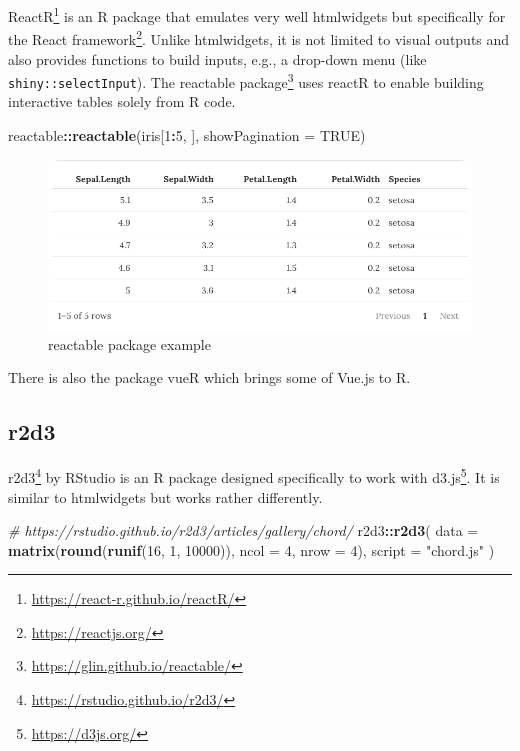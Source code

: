 \documentclass[
  10pt,
]{krantz}
\makeatletter
\newenvironment{Shaded}{\begin{snugshade}}{\end{snugshade}}
\newcommand{\CommentTok}[1]{\textcolor[rgb]{0.37,0.37,0.37}{\textit{#1}}}
\newcommand{\DataTypeTok}[1]{\textcolor[rgb]{0.27,0.27,0.27}{#1}}
\newcommand{\DecValTok}[1]{\textcolor[rgb]{0.06,0.06,0.06}{#1}}
\newcommand{\KeywordTok}[1]{\textcolor[rgb]{0.27,0.27,0.27}{\textbf{#1}}}
\newcommand{\NormalTok}[1]{#1}
\newcommand{\OperatorTok}[1]{\textcolor[rgb]{0.43,0.43,0.43}{\textbf{#1}}}
\newcommand{\OtherTok}[1]{\textcolor[rgb]{0.37,0.37,0.37}{#1}}
\newcommand{\StringTok}[1]{\textcolor[rgb]{0.5,0.5,0.5}{#1}}
\renewcommand{\href}[2]{#2\footnote{\url{#1}}}
\newenvironment{kframe}{%
\medskip{}
\setlength{\fboxsep}{.8em}
 \def\at@end@of@kframe{}%
 \ifinner\ifhmode%
  \def\at@end@of@kframe{\end{minipage}}%
  \begin{minipage}{\columnwidth}%
 \fi\fi%
 \def\FrameCommand##1{\hskip\@totalleftmargin \hskip-\fboxsep
 \colorbox{shadecolor}{##1}\hskip-\fboxsep
     \hskip-\linewidth \hskip-\@totalleftmargin \hskip\columnwidth}%
 \MakeFramed {\advance\hsize-\width
   \@totalleftmargin\z@ \linewidth\hsize
   \@setminipage}}%
 {\par\unskip\endMakeFramed%
 \at@end@of@kframe}
\renewenvironment{Shaded}{\begin{kframe}}{\end{kframe}}
\makeatother
\begin{document}
\href{https://react-r.github.io/reactR/}{ReactR} \citep{R-reactR} is an R package that emulates very well htmlwidgets but specifically for the \href{https://reactjs.org/}{React framework}. Unlike htmlwidgets, it is not limited to visual outputs and also provides functions to build inputs, e.g., a drop-down menu (like \texttt{shiny::selectInput}). The \href{https://glin.github.io/reactable/}{reactable package} \citep{R-reactable} uses reactR to enable building interactive tables solely from R code.

\begin{Shaded}
\begin{Highlighting}[]
\NormalTok{reactable}\OperatorTok{::}\KeywordTok{reactable}\NormalTok{(iris[}\DecValTok{1}\OperatorTok{:}\DecValTok{5}\NormalTok{, ], }\DataTypeTok{showPagination =} \OtherTok{TRUE}\NormalTok{)}
\end{Highlighting}
\end{Shaded}

\begin{figure}[H]

{\centering \includegraphics[width=1\linewidth]{images/01-reactable} 

}

\caption{reactable package example}\label{fig:reactable-example}
\end{figure}

There is also the package vueR \citep{R-vueR} which brings some of Vue.js to R.

\hypertarget{intro-r2d3}{%
\subsection{r2d3}\label{intro-r2d3}}

\href{https://rstudio.github.io/r2d3/}{r2d3} \citep{R-r2d3} by RStudio is an R package designed specifically to work with \href{https://d3js.org/}{d3.js}. It is similar to htmlwidgets but works rather differently.

\begin{Shaded}
\begin{Highlighting}[]
\CommentTok{\# https://rstudio.github.io/r2d3/articles/gallery/chord/}
\NormalTok{r2d3}\OperatorTok{::}\KeywordTok{r2d3}\NormalTok{(}
  \DataTypeTok{data =} \KeywordTok{matrix}\NormalTok{(}\KeywordTok{round}\NormalTok{(}\KeywordTok{runif}\NormalTok{(}\DecValTok{16}\NormalTok{, }\DecValTok{1}\NormalTok{, }\DecValTok{10000}\NormalTok{)), }\DataTypeTok{ncol =} \DecValTok{4}\NormalTok{, }\DataTypeTok{nrow =} \DecValTok{4}\NormalTok{), }
  \DataTypeTok{script =} \StringTok{"chord.js"}
\NormalTok{)}
\end{Highlighting}
\end{Shaded}
\end{document}
